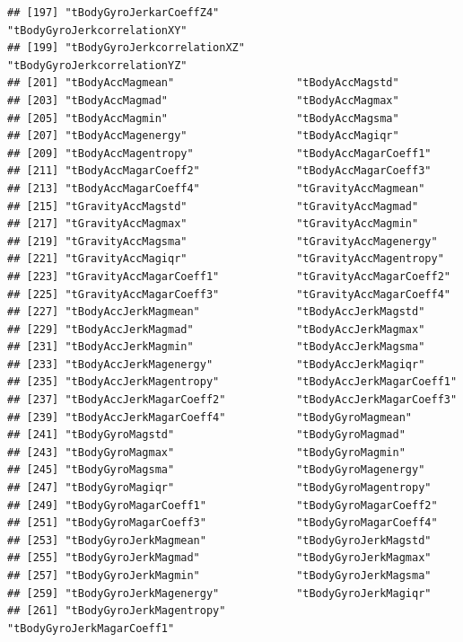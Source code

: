 \documentclass[
]{article}
\begin{document}
\begin{verbatim}
## [197] "tBodyGyroJerkarCoeffZ4"            "tBodyGyroJerkcorrelationXY"       
## [199] "tBodyGyroJerkcorrelationXZ"        "tBodyGyroJerkcorrelationYZ"       
## [201] "tBodyAccMagmean"                   "tBodyAccMagstd"                   
## [203] "tBodyAccMagmad"                    "tBodyAccMagmax"                   
## [205] "tBodyAccMagmin"                    "tBodyAccMagsma"                   
## [207] "tBodyAccMagenergy"                 "tBodyAccMagiqr"                   
## [209] "tBodyAccMagentropy"                "tBodyAccMagarCoeff1"              
## [211] "tBodyAccMagarCoeff2"               "tBodyAccMagarCoeff3"              
## [213] "tBodyAccMagarCoeff4"               "tGravityAccMagmean"               
## [215] "tGravityAccMagstd"                 "tGravityAccMagmad"                
## [217] "tGravityAccMagmax"                 "tGravityAccMagmin"                
## [219] "tGravityAccMagsma"                 "tGravityAccMagenergy"             
## [221] "tGravityAccMagiqr"                 "tGravityAccMagentropy"            
## [223] "tGravityAccMagarCoeff1"            "tGravityAccMagarCoeff2"           
## [225] "tGravityAccMagarCoeff3"            "tGravityAccMagarCoeff4"           
## [227] "tBodyAccJerkMagmean"               "tBodyAccJerkMagstd"               
## [229] "tBodyAccJerkMagmad"                "tBodyAccJerkMagmax"               
## [231] "tBodyAccJerkMagmin"                "tBodyAccJerkMagsma"               
## [233] "tBodyAccJerkMagenergy"             "tBodyAccJerkMagiqr"               
## [235] "tBodyAccJerkMagentropy"            "tBodyAccJerkMagarCoeff1"          
## [237] "tBodyAccJerkMagarCoeff2"           "tBodyAccJerkMagarCoeff3"          
## [239] "tBodyAccJerkMagarCoeff4"           "tBodyGyroMagmean"                 
## [241] "tBodyGyroMagstd"                   "tBodyGyroMagmad"                  
## [243] "tBodyGyroMagmax"                   "tBodyGyroMagmin"                  
## [245] "tBodyGyroMagsma"                   "tBodyGyroMagenergy"               
## [247] "tBodyGyroMagiqr"                   "tBodyGyroMagentropy"              
## [249] "tBodyGyroMagarCoeff1"              "tBodyGyroMagarCoeff2"             
## [251] "tBodyGyroMagarCoeff3"              "tBodyGyroMagarCoeff4"             
## [253] "tBodyGyroJerkMagmean"              "tBodyGyroJerkMagstd"              
## [255] "tBodyGyroJerkMagmad"               "tBodyGyroJerkMagmax"              
## [257] "tBodyGyroJerkMagmin"               "tBodyGyroJerkMagsma"              
## [259] "tBodyGyroJerkMagenergy"            "tBodyGyroJerkMagiqr"              
## [261] "tBodyGyroJerkMagentropy"           "tBodyGyroJerkMagarCoeff1"         

\end{verbatim}
\end{document}
